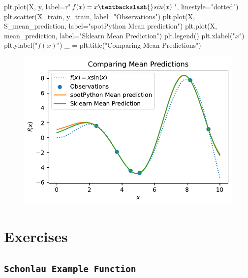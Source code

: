 \documentclass[
  letterpaper,
  DIV=11,
  numbers=noendperiod]{scrreprt}
\newenvironment{Shaded}{\begin{snugshade}}{\end{snugshade}}
\newcommand{\NormalTok}[1]{\textcolor[rgb]{0.00,0.23,0.31}{#1}}
\newcommand{\OperatorTok}[1]{\textcolor[rgb]{0.37,0.37,0.37}{#1}}
\newcommand{\StringTok}[1]{\textcolor[rgb]{0.13,0.47,0.30}{#1}}
\newcommand{\VerbatimStringTok}[1]{\textcolor[rgb]{0.13,0.47,0.30}{#1}}
\begin{document}
\begin{Shaded}
\begin{Highlighting}[]
\NormalTok{plt.plot(X, y, label}\OperatorTok{=}\VerbatimStringTok{r"$f(x) = x \textbackslash{}sin(x)$"}\NormalTok{, linestyle}\OperatorTok{=}\StringTok{"dotted"}\NormalTok{)}
\NormalTok{plt.scatter(X\_train, y\_train, label}\OperatorTok{=}\StringTok{"Observations"}\NormalTok{)}
\NormalTok{plt.plot(X, S\_mean\_prediction, label}\OperatorTok{=}\StringTok{"spotPython Mean prediction"}\NormalTok{)}
\NormalTok{plt.plot(X, mean\_prediction, label}\OperatorTok{=}\StringTok{"Sklearn Mean Prediction"}\NormalTok{)}
\NormalTok{plt.legend()}
\NormalTok{plt.xlabel(}\StringTok{"$x$"}\NormalTok{)}
\NormalTok{plt.ylabel(}\StringTok{"$f(x)$"}\NormalTok{)}
\NormalTok{\_ }\OperatorTok{=}\NormalTok{ plt.title(}\StringTok{"Comparing Mean Predictions"}\NormalTok{)}
\end{Highlighting}
\end{Shaded}

\begin{figure}[H]

{\centering \includegraphics{06_spot_gaussian_files/figure-pdf/cell-8-output-1.pdf}

}

\end{figure}

\hypertarget{exercises-4}{%
\section{Exercises}\label{exercises-4}}

\hypertarget{schonlau-example-function}{%
\subsection{\texorpdfstring{\texttt{Schonlau\ Example\ Function}}{Schonlau Example Function}}\label{schonlau-example-function}}
\end{document}
